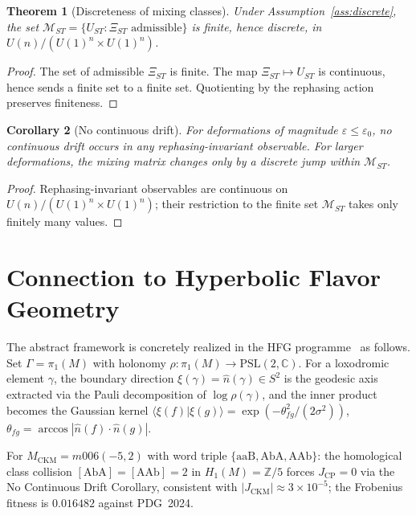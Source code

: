 \documentclass[11pt,a4paper]{article}
\newtheorem{theorem}{Theorem}
\newtheorem{corollary}[theorem]{Corollary}
\begin{document}
\begin{theorem}[Discreteness of mixing classes]
\label{thm:discreteness}
Under Assumption~\ref{ass:discrete}, the set
$\mathcal{M}_{ST}=\{U_{ST}:\Xi_{ST}\text{ admissible}\}$
is finite, hence discrete, in
$U(n)/(U(1)^n\times U(1)^n)$.
\end{theorem}

\begin{proof}
The set of admissible $\Xi_{ST}$ is finite.
The map $\Xi_{ST}\mapsto U_{ST}$ is continuous, hence sends a finite
set to a finite set.
Quotienting by the rephasing action preserves finiteness.
\end{proof}

\begin{corollary}[No continuous drift]
For deformations of magnitude $\varepsilon\leq\varepsilon_0$, no
continuous drift occurs in any rephasing-invariant observable.
For larger deformations, the mixing matrix changes only by a discrete
jump within $\mathcal{M}_{ST}$.
\end{corollary}

\begin{proof}
Rephasing-invariant observables are continuous on
$U(n)/(U(1)^n\times U(1)^n)$;
their restriction to the finite set $\mathcal{M}_{ST}$ takes only
finitely many values.
\end{proof}

\section{Connection to Hyperbolic Flavor Geometry}
\label{sec:hfg}

The abstract framework is concretely realized in the HFG
programme~\cite{Gentry:CKM,Gentry:PMNS,Gentry:Unified} as follows.
Set $\Gamma=\pi_1(M)$ with holonomy
$\rho:\pi_1(M)\to\mathrm{PSL}(2,\mathbb{C})$.
For a loxodromic element $\gamma$, the boundary direction
$\xi(\gamma)=\hat{n}(\gamma)\in S^2$ is the geodesic axis extracted
via the Pauli decomposition of $\log\rho(\gamma)$,
and the inner product becomes the Gaussian kernel
$\langle\xi(f)|\xi(g)\rangle=\exp(-\theta_{fg}^2/(2\sigma^2))$,
$\theta_{fg}=\arccos|\hat{n}(f)\cdot\hat{n}(g)|$.

For $M_{\mathrm{CKM}}=m006(-5,2)$ with word triple
$\{\mathrm{aaB},\mathrm{AbA},\mathrm{AAb}\}$:
the homological class collision
$[\mathrm{AbA}]=[\mathrm{AAb}]=2$ in $H_1(M)=\mathbb{Z}/5$
forces $J_{\mathrm{CP}}=0$ via the No Continuous Drift Corollary,
consistent with $|J_{\mathrm{CKM}}|\approx3\times10^{-5}$;
the Frobenius fitness is $0.016482$ against PDG~2024.
\end{document}
